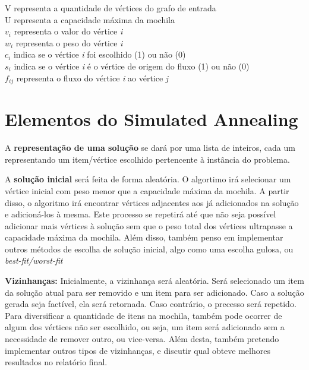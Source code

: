 \documentclass[14pt]{extarticle}
\begin{document}
\hspace*{2ex} V representa a quantidade de vértices do grafo de entrada\\
\hspace*{2ex} U representa a capacidade máxima da mochila\\
\hspace*{2ex} $v_i$ representa o valor do vértice \textit{i}\\
\hspace*{2ex} $w_i$ representa o peso do vértice \textit{i}\\
\hspace*{2ex} $c_i$ indica se o vértice \textit{i} foi escolhido (1) ou não (0)\\
\hspace*{2ex} $s_i$ indica se o vértice \textit{i} é o vértice de origem do fluxo (1) ou não (0)\\
\hspace*{2ex} $f_{ij}$ representa o fluxo do vértice \textit{i} ao vértice \textit{j}\\

\section{Elementos do Simulated Annealing}

A \textbf{representação de uma solução} se dará por uma lista de inteiros, cada um representando um item/vértice escolhido pertencente à instância do problema.

A \textbf{solução inicial} será feita de forma aleatória. O algortimo irá selecionar um vértice inicial com peso menor que a capacidade máxima da mochila. A partir disso, o algoritmo irá encontrar vértices adjacentes aos já adicionados na solução e adicioná-los à mesma. Este processo se repetirá até que não seja possível adicionar mais vértices à solução sem que o peso total dos vértices ultrapasse a capacidade máxima da mochila. Além disso, também penso em implementar outros métodos de escolha de solução inicial, algo como uma escolha gulosa, ou \textit{best-fit/worst-fit}

\textbf{Vizinhanças:} Inicialmente, a vizinhança será aleatória. Será selecionado um item da solução atual para ser removido e um item para ser adicionado. Caso a solução gerada seja factível, ela será retornada. Caso contrário, o precesso será repetido. Para diversificar a quantidade de itens na mochila, também pode ocorrer de algum dos vértices não ser escolhido, ou seja, um item será adicionado sem a necessidade de remover outro, ou vice-versa.
Além desta, também pretendo implementar outros tipos de vizinhanças, e discutir qual obteve melhores resultados no relatório final.
\end{document}
